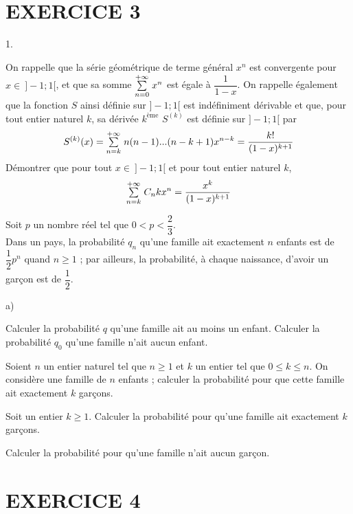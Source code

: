 \documentclass[11pt]{article}%
\begin{document}
\section*{EXERCICE 3}

\begin{noliste}{1.}
 \setlength{\itemsep}{4mm}
\item On rappelle que la série géométrique de terme général $x^{n}$ est
convergente pour $x\in \ ]-1;1[$, et que sa somme ${\textstyle\sum\limits_{n = 0}^{+ \infty
}}\hspace{.1cm}x^{n}$
est égale à $\dfrac{1}{1-x}$. On rappelle également que la fonction $S$
ainsi définie sur $]-1;1[$ est indéfiniment dérivable et que, pour tout
entier naturel $k$, sa dérivée $k^{\text{ème}}$ $S^{(k)}$ est définie
sur $]-1;1[$ par 
\[
S^{(k)}(x) = {\textstyle\sum\limits_{n = k}^{+ \infty }}\hspace{.1cm}n(n-1)...(n-k + 1)x^{n-k} =
\dfrac{k!}{(1-x)^{k + 1}}
\]
Démontrer que pour tout $x\in \ ]-1;1[$ et pour tout entier naturel
$k$, 
\[
{\textstyle\sum\limits_{n = k}^{+ \infty }}\hspace{.1cm}C_{n}{k}x^{n} = \dfrac{x^{k}}{(1-x)^{k + 1}}
\]

\item Soit $p$ un nombre réel tel que $0<p<\dfrac{2}{3}$. \\
Dans un pays, la probabilité $q_{n}$ qu'une famille ait exactement $n$
enfants est de $\dfrac{1}{2}p^{n}$ quand $n\geq 1$ ; par ailleurs, la
probabilité, à chaque naissance, d'avoir un garçon est de
$\dfrac{1}{2}$.

\begin{noliste}{a)}
 \setlength{\itemsep}{2mm}
\item Calculer la probabilité $q$ qu'une famille ait au moins un
enfant.
Calculer la probabilité $q_{0}$ qu'une famille n'ait aucun enfant.

\item Soient $n$ un entier naturel tel que $n\geq 1$ et $k$ un entier
tel que $0\leq k\leq n$. On considère une famille de $n$ enfants ;
calculer la probabilité pour que cette famille ait exactement $k$
garçons.

\item Soit un entier $k\geq 1$. Calculer la probabilité pour qu'une
famille ait exactement $k$ garçons.

\item Calculer la probabilité pour qu'une famille n'ait aucun garçon.
\end{noliste}
\end{noliste}

\section*{EXERCICE 4}
\end{document}
